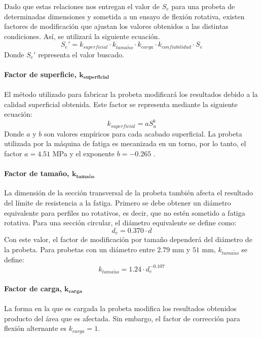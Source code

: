 Dado que estas relaciones nos entregan el valor de $S_e$ para una probeta de determinadas dimensiones y sometida a un ensayo de flexión rotativa, existen factores de modificación que ajustan los valores obtenidos a las distintas condiciones. Así, se utilizará la siguiente ecuación.
\begin{equation}\label{eq:se_prima}
	S_e' = k_{superficial} \cdot k_{tama\tilde{n}o} \cdot k_{carga} \cdot k_{confiabilidad} \cdot S_e
\end{equation}
Donde $S_e'$ representa el valor buscado.

\paragraph{Factor de superficie, $\mathbf{k_{superficial}}$}
El método utilizado para fabricar la probeta modificará los resultados debido a la calidad superficial obtenida. Este factor se representa mediante la siguiente ecuación:
\begin{equation}
	k_{superficial} = aS_u^b
\end{equation}
Donde $a$ y $b$ son valores empíricos para cada acabado superficial. La probeta utilizada por la máquina de fatiga es mecanizada en un torno, por lo tanto, el factor $a = 4.51$ MPa y el exponente $b = -0.265$ \cite{budynas2008shigley}.

\paragraph{Factor de tamaño, $\mathbf{k_{\text{tamaño}}}$}
La dimensión de la sección transversal de la probeta también afecta el resultado del límite de resistencia a la fatiga. Primero se debe obtener un diámetro equivalente para perfiles no rotativos, es decir, que no estén sometido a fatiga rotativa. Para una sección circular, el diámetro equivalente se define como:
\begin{equation}
	d_e = 0.370\cdot d
\end{equation}
Con este valor, el factor de modificación por tamaño dependerá del diámetro de la probeta. Para probetas con un diámetro entre $2.79$ mm y $51$ mm,  $k_{tama\tilde{n}o}$ se define:
\begin{equation}
	k_{tama\tilde{n}o} = 1.24\cdot d_e^{-0.107}
\end{equation}

\paragraph{Factor de carga, $\mathbf{k_{carga}}$}
La forma en la que es cargada la probeta modifica los resultados obtenidos producto del área que es afectada. Sin embargo, el factor de corrección para flexión alternante es $k_{carga} = 1$.

